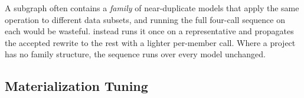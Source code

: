 


A subgraph often contains a \emph{family} of near-duplicate models that apply the same operation to different data subsets, and running the full four-call sequence on each would be wasteful. \dagsmith{} instead runs it once on a representative and propagates the accepted rewrite to the rest with a lighter per-member call. Where a project has no family structure, the sequence runs over every model unchanged.












\subsection{Materialization Tuning}
\label{dag:sec:materialization}



